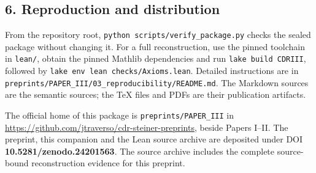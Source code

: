 \documentclass[english,11pt,a4paper]{article}
\begin{document}
\subsection{6. Reproduction and distribution}\label{reproduction-and-distribution}

From the repository root, \texttt{python\ scripts/\allowbreak{}verify\_\allowbreak{}package.\allowbreak{}py} checks the sealed package without changing it. For a full reconstruction, use the pinned toolchain in \texttt{lean/\allowbreak{}}, obtain the pinned Mathlib dependencies and run \texttt{lake\ build\ CDRIII}, followed by \texttt{lake\ env\ lean\ checks/\allowbreak{}Axioms.\allowbreak{}lean}. Detailed instructions are in \texttt{preprints/\allowbreak{}PAPER\_\allowbreak{}III/\allowbreak{}03\_\allowbreak{}reproducibility/\allowbreak{}README.\allowbreak{}md}. The Markdown sources are the semantic sources; the TeX files and PDFs are their publication artifacts.

The official home of this package is \texttt{preprints/\allowbreak{}PAPER\_\allowbreak{}III} in \url{https://github.com/jtraverso/cdr-steiner-preprints}, beside Papers I--II. The preprint, this companion and the Lean source archive are deposited under DOI \textbf{10.5281/zenodo.24201563}. The source archive includes the complete source-bound reconstruction evidence for this preprint.
\end{document}
